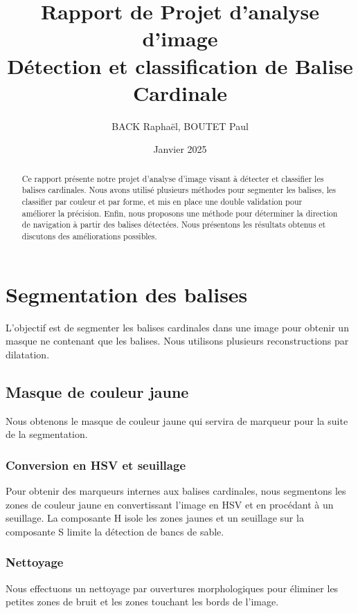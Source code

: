 \documentclass{article}
\title{Rapport de Projet d'analyse d'image\\ Détection et classification de Balise Cardinale}
\author{BACK Raphaël, BOUTET Paul}
\date{Janvier 2025}
\begin{document}
\maketitle

\begin{abstract}
    Ce rapport présente notre projet d'analyse d'image visant à détecter et classifier les balises cardinales. Nous avons utilisé plusieurs méthodes pour segmenter les balises, les classifier par couleur et par forme, et mis en place une double validation pour améliorer la précision. Enfin, nous proposons une méthode pour déterminer la direction de navigation à partir des balises détectées. Nous présentons les résultats obtenus et discutons des améliorations possibles.
\end{abstract}

\setcounter{tocdepth}{2}
\tableofcontents

\newpage

\section{Segmentation des balises}

L'objectif est de segmenter les balises cardinales dans une image pour obtenir
un masque ne contenant que les balises. Nous utilisons plusieurs
reconstructions par dilatation.

\subsection{Masque de couleur jaune}

Nous obtenons le masque de couleur jaune qui servira de marqueur pour la suite
de la segmentation.

\subsubsection{Conversion en HSV et seuillage}
Pour obtenir des marqueurs internes aux balises cardinales, nous segmentons les
zones de couleur jaune en convertissant l'image en HSV et en procédant à un
seuillage. La composante H isole les zones jaunes et un seuillage sur la
composante S limite la détection de bancs de sable.

\subsubsection{Nettoyage}
Nous effectuons un nettoyage par ouvertures morphologiques pour éliminer les
petites zones de bruit et les zones touchant les bords de l'image.
\end{document}
